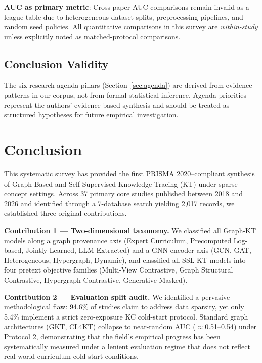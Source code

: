 ﻿\documentclass[10pt,journal,compsoc]{IEEEtran}
\begin{document}
\textbf{AUC as primary metric}: Cross-paper AUC comparisons remain invalid as a league table due to heterogeneous dataset splits, preprocessing pipelines, and random seed policies. All quantitative comparisons in this survey are \textit{within-study} unless explicitly noted as matched-protocol comparisons.

\subsection{Conclusion Validity}
The six research agenda pillars (Section~\ref{sec:agenda}) are derived from evidence patterns in our corpus, not from formal statistical inference. Agenda priorities represent the authors' evidence-based synthesis and should be treated as structured hypotheses for future empirical investigation.

\section{Conclusion}
\label{sec:conclusion}

This systematic survey has provided the first PRISMA 2020--compliant synthesis of Graph-Based and Self-Supervised Knowledge Tracing (KT) under sparse-concept settings. Across 37 primary core studies published between 2018 and 2026 and identified through a 7-database search yielding 2,017 records, we established three original contributions.

\textbf{Contribution 1 --- Two-dimensional taxonomy.} We classified all Graph-KT models along a graph provenance axis (Expert Curriculum, Precomputed Log-based, Jointly Learned, LLM-Extracted) and a GNN encoder axis (GCN, GAT, Heterogeneous, Hypergraph, Dynamic), and classified all SSL-KT models into four pretext objective families (Multi-View Contrastive, Graph Structural Contrastive, Hypergraph Contrastive, Generative Masked).

\textbf{Contribution 2 --- Evaluation split audit.} We identified a pervasive methodological flaw: 94.6\% of studies claim to address data sparsity, yet only 5.4\% implement a strict zero-exposure KC cold-start protocol. Standard graph architectures (GKT, CL4KT) collapse to near-random AUC ($\approx$0.51--0.54) under Protocol 2, demonstrating that the field's empirical progress has been systematically measured under a lenient evaluation regime that does not reflect real-world curriculum cold-start conditions.
\end{document}
